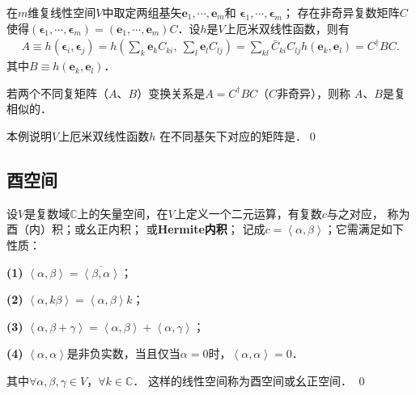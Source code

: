 \begin{example}
    在$m$维复线性空间$V$中取定两组基矢$\boldsymbol{e}_1,\cdots,\boldsymbol{e}_m$和
    $\boldsymbol{\epsilon}_1,\cdots,\boldsymbol{\epsilon}_m$；
    存在非奇异复数矩阵$C$使得$(\boldsymbol{\epsilon}_1,\cdots,\boldsymbol{\epsilon}_m)
    =(\boldsymbol{e}_1,\cdots,\boldsymbol{e}_m)C$．设$h$是$V$上厄米双线性函数，则有
    \begin{align*}
        A\equiv h(\boldsymbol{\epsilon}_i, \boldsymbol{\epsilon}_j)
        =h\left(\sum\nolimits_k \boldsymbol{e}_k C_{ki},\ \sum\nolimits_l \boldsymbol{e}_l C_{lj}\right)
        =\sum\nolimits_{kl} \bar{C}_{ki} C_{lj} h(\boldsymbol{e}_k, \boldsymbol{e}_l)
        =C^\dagger B C. 
    \end{align*}
    其中$B\equiv h(\boldsymbol{e}_k, \boldsymbol{e}_l)$．    
    
    若两个不同复矩阵（$A$、$B$）变换关系是$A= C^\dagger B C$（$C$非奇异），则称
    $A$、$B$是{\heiti 复相似的}．
    
    本例说明$V$上厄米双线性函数$h$
    在不同基矢下对应的矩阵是．\qed
\end{example}



\subsection{酉空间}\label{chcx:sec_unitary}
\begin{definition} \label{chcx:def_unitary-space}
    设$V$是复数域$\mathbb{C}$上的矢量空间，在$V$上定义一个二元运算，有复数$c$与之对应，
    称为{\heiti 酉（内）积}；或{\heiti 幺正内积}；
    或{\heiti \bfseries Hermite内积}；
    记成$c=\left<\alpha,\beta\right>$；它需满足如下性质：
    
    {\bfseries (1)} $\left<\alpha,\beta\right>=\overline{\left<\beta,\alpha\right>}$；
    
    {\bfseries (2)} $\left<\alpha,k\beta\right>=\left<\alpha,\beta\right>k$；
    
    {\bfseries (3)} $\left<\alpha,\beta+\gamma\right>=\left<\alpha,\beta\right>+\left<\alpha,\gamma\right>$； 
    
    {\bfseries (4)} $\left<\alpha,\alpha\right>$是非负实数，当且仅当$\alpha=0$时，$\left<\alpha,\alpha\right> = 0$．
    
    \noindent 其中$\forall\alpha,\beta,\gamma \in V$，$\forall k\in \mathbb{C}$．
    这样的线性空间称为{\heiti 酉空间}或{\heiti 幺正空间}． \qed
\end{definition}


